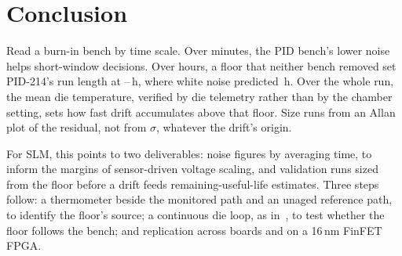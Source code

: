 \documentclass[10pt,twocolumn]{article}
\begin{document}
\section{Conclusion}

Read a burn-in bench by time scale. Over minutes, the PID bench's lower noise helps short-window decisions. Over hours, a floor that neither bench removed set PID-214's run length at \vDetLo--\vDetHi\,h, where white noise predicted \vTminBound\,h. Over the whole run, the mean die temperature, verified by die telemetry rather than by the chamber setting, sets how fast drift accumulates above that floor. Size runs from an Allan plot of the residual, not from $\sigma$, whatever the drift's origin.

For SLM, this points to two deliverables: noise figures by averaging time, to inform the margins of sensor-driven voltage scaling, and validation runs sized from the floor before a drift feeds remaining-useful-life estimates. Three steps follow: a thermometer beside the monitored path and an unaged reference path, to identify the floor's source; a continuous die loop, as in~\cite{sobas,xilinx}, to test whether the floor follows the bench; and replication across boards and on a 16\,nm FinFET FPGA.
\end{document}

